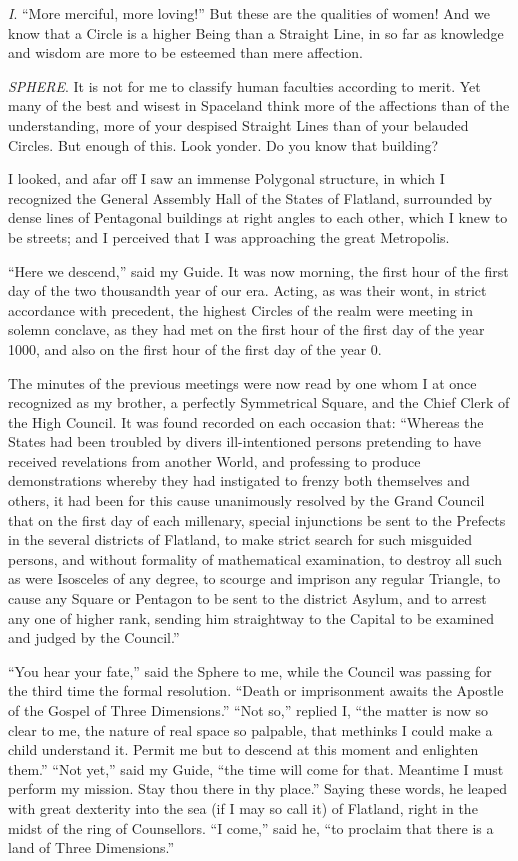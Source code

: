 \documentclass[10pt, kindle, oneside]{kindle}
\begin{document}
\emph{I}. ``More merciful, more loving!'' But these are the qualities of women! And we
know that a Circle is a higher Being than a Straight Line, in so far as
knowledge and wisdom are more to be esteemed than mere affection.

\emph{SPHERE}. It is not for me to classify human faculties according to merit. Yet
many of the best and wisest in Spaceland think more of the affections than of
the understanding, more of your despised Straight Lines than of your belauded
Circles. But enough of this. Look yonder. Do you know that building?

I looked, and afar off I saw an immense Polygonal structure, in which I
recognized the General Assembly Hall of the States of Flatland, surrounded by
dense lines of Pentagonal buildings at right angles to each other, which I
knew to be streets; and I perceived that I was approaching the great
Metropolis.

``Here we descend,'' said my Guide. It was now morning, the first hour of the
first day of the two thousandth year of our era. Acting, as was their wont, in
strict accordance with precedent, the highest Circles of the realm were
meeting in solemn conclave, as they had met on the first hour of the first day
of the year 1000, and also on the first hour of the first day of the year 0.

The minutes of the previous meetings were now read by one whom I at once
recognized as my brother, a perfectly Symmetrical Square, and the Chief Clerk
of the High Council. It was found recorded on each occasion that: ``Whereas the
States had been troubled by divers ill-intentioned persons pretending to have
received revelations from another World, and professing to produce
demonstrations whereby they had instigated to frenzy both themselves and
others, it had been for this cause unanimously resolved by the Grand Council
that on the first day of each millenary, special injunctions be sent to the
Prefects in the several districts of Flatland, to make strict search for such
misguided persons, and without formality of mathematical examination, to
destroy all such as were Isosceles of any degree, to scourge and imprison any
regular Triangle, to cause any Square or Pentagon to be sent to the district
Asylum, and to arrest any one of higher rank, sending him straightway to the
Capital to be examined and judged by the Council.''

``You hear your fate,'' said the Sphere to me, while the Council was passing for
the third time the formal resolution. ``Death or imprisonment awaits the
Apostle of the Gospel of Three Dimensions.'' ``Not so,'' replied I, ``the matter
is now so clear to me, the nature of real space so palpable, that methinks I
could make a child understand it. Permit me but to descend at this moment and
enlighten them.'' ``Not yet,'' said my Guide, ``the time will come for that.
Meantime I must perform my mission. Stay thou there in thy place.'' Saying
these words, he leaped with great dexterity into the sea (if I may so call it)
of Flatland, right in the midst of the ring of Counsellors. ``I come,'' said he,
``to proclaim that there is a land of Three Dimensions.''
\end{document}
